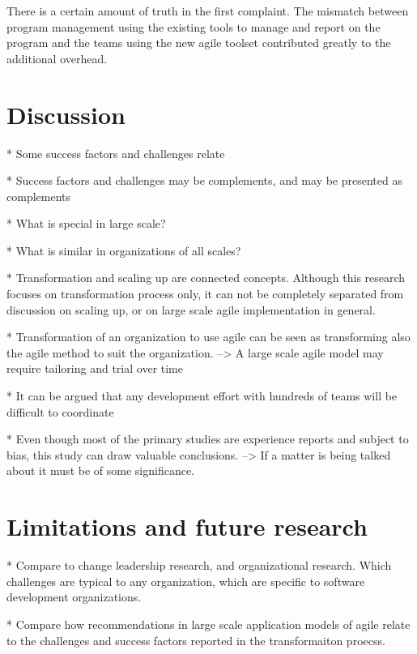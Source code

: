 \documentclass[preprint,authoryear,12pt]{elsarticle}
\begin{document}
There is a certain amount of truth in the first complaint. The mismatch between
program management using the existing tools to manage and report on the program
and the teams using the new agile toolset contributed greatly to the additional
overhead.








\section{Discussion}
\label{sec:discussion}

* Some success factors and challenges relate

* Success factors and challenges may be complements, and may be presented as
  complements

* What is special in large scale?

* What is similar in organizations of all scales?

* Transformation and scaling up are connected concepts. Although this research
  focuses on transformation process only, it can not be completely separated
  from discussion on scaling up, or on large scale agile implementation in
  general.

* Transformation of an organization to use agile can be seen as transforming
  also the agile method to suit the organization.
  --> A large scale agile model may require tailoring and trial over time

* It can be argued that any development effort with hundreds of teams will be
  difficult to coordinate

* Even though most of the primary studies are experience reports and subject to
  bias, this study can draw valuable conclusions. --> If a matter is being
  talked about it must be of some significance.

\section{Limitations and future research}
\label{sec:conclusion}

* Compare to change leadership research, and organizational research. Which
  challenges are typical to any organization, which are specific to software
  development organizations.

* Compare how recommendations in large scale application models of agile relate
  to the challenges and success factors reported in the transformaiton proecss. 






\end{document}
